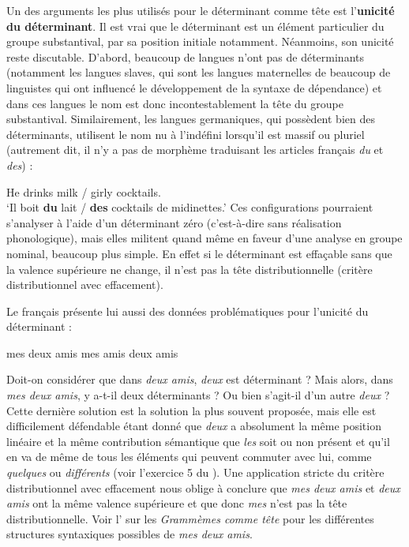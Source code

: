 Un des arguments les plus utilisés pour le déterminant comme tête est l’\textbf{unicité du déterminant}. Il est vrai que le déterminant est un élément particulier du groupe substantival, par sa position initiale notamment. Néanmoins, son unicité reste discutable. D’abord, beaucoup de langues n’ont pas de déterminants (notamment les langues slaves, qui sont les langues maternelles de beaucoup de linguistes qui ont influencé le développement de la syntaxe de dépendance) et dans ces langues le nom est donc incontestablement la tête du groupe substantival. Similairement, les langues germaniques, qui possèdent bien des déterminants, utilisent le nom nu à l’indéfini lorsqu’il est massif ou pluriel (autrement dit, il n’y a pas de morphème traduisant les articles français \textit{du} et \textit{des}) :

\ea
{He drinks milk / girly cocktails.}\\
\glt ‘Il boit \textbf{du} lait / \textbf{des} cocktails de midinettes.’
\z
Ces configurations pourraient s’analyser à l’aide d’un déterminant zéro (c’est-à-dire sans réalisation phonologique), mais elles militent quand même en faveur d’une analyse en groupe nominal, beaucoup plus simple. En effet si le déterminant est effaçable sans que la valence supérieure ne change, il n’est pas la tête distributionnelle (critère distributionnel avec effacement).

Le français présente lui aussi des données problématiques pour l’unicité du déterminant :

\ea
  \ea mes deux amis
  \ex mes amis
  \ex deux amis
  \z
\z

Doit-on considérer que dans \textit{deux amis}, \textit{deux} est déterminant ? Mais alors, dans \textit{mes deux amis}, y a-t-il deux déterminants ? Ou bien s’agit-il d’un autre \textit{deux} ? Cette dernière solution est la solution la plus souvent proposée, mais elle est difficilement défendable étant donné que \textit{deux} a absolument la même position linéaire et la même contribution sémantique que \textit{les} soit ou non présent et qu’il en va de même de tous les éléments qui peuvent commuter avec lui, comme \textit{quelques} ou \textit{différents} (voir l’exercice 5 du ). Une application stricte du critère distributionnel avec effacement nous oblige à conclure que \textit{mes deux amis} et \textit{deux amis} ont la même valence supérieure et que donc \textit{mes} n’est pas la tête distributionnelle. Voir l’ sur les \textit{Grammèmes comme tête} pour les différentes structures syntaxiques possibles de \textit{mes deux amis}.

